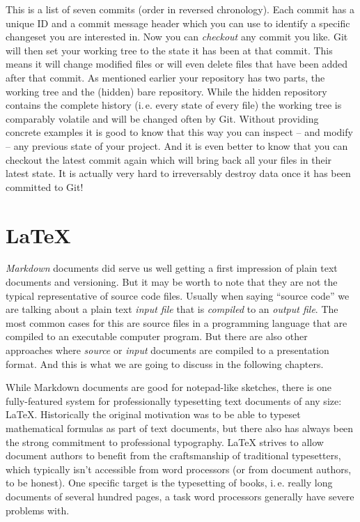 \documentclass[../../LilyPond-Tutorials]{subfiles}
\begin{document}
This is a list of seven commits (order in reversed chronology).
Each commit has a unique ID and a commit message header which you can use to identify a specific changeset you are interested in.
Now you can \emph{checkout} any commit you like.
Git will then set your working tree to the state it has been at that commit.
This means it will change modified files or will even delete files that have been added after that commit.
As mentioned earlier your repository has two parts, the working tree and the (hidden) bare repository.
While the hidden repository contains the complete history (i.\,e. every state of every file) the working tree is comparably volatile and will be changed often by Git.
Without providing concrete examples it is good to know that this way you can inspect -- and modify -- any previous state of your project.
And it is even better to know that you can checkout the latest commit again which will bring back all your files in their latest state.
It is actually very hard to irreversably destroy data once it has been committed to Git!

\chapter{\LaTeX}
\emph{Markdown} documents did serve us well getting a first impression of plain text documents and versioning.
But it may be worth to note that they are not the typical representative of source code files.
Usually when saying “source code” we are talking about a plain text \emph{input file} that is \emph{compiled} to an \emph{output file}.
The most common cases for this are source files in a programming language that are compiled to an executable computer program.
But there are also other approaches where \emph{source} or \emph{input} documents are compiled to a presentation format.
And this is what we are going to discuss in the following chapters.

While Markdown documents are good for notepad-like sketches, there is one fully-featured system for professionally typesetting text documents of any size: \LaTeX.
Historically the original motivation was to be able to typeset mathematical formulas as part of text documents, but there also has always been the strong commitment to professional typography.
\LaTeX{} strives to allow document authors to benefit from the craftsmanship of traditional typesetters, which typically isn't accessible from word processors (or from document authors, to be honest).
One specific target is the typesetting of books, i.\,e. really long documents of several hundred pages, a task word processors generally have severe problems with.
\end{document}
